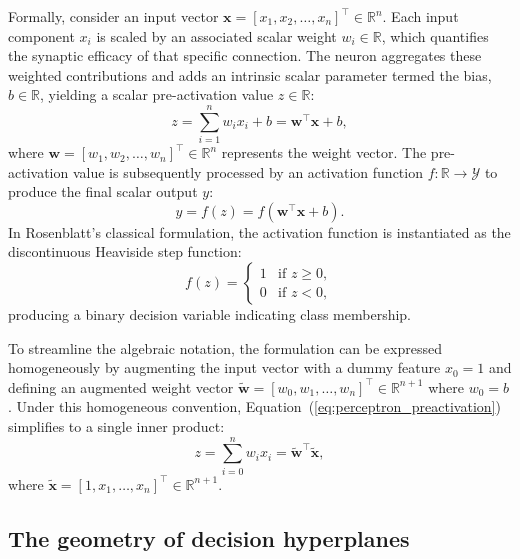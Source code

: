 \documentclass[../../main.tex]{subfiles}
\begin{document}
Formally, consider an input vector $\mathbf{x} = [x_1, x_2, \dots, x_n]^\top \in \mathbb{R}^n$. Each input component $x_i$ is scaled by an associated scalar weight $w_i \in \mathbb{R}$, which quantifies the synaptic efficacy of that specific connection. The neuron aggregates these weighted contributions and adds an intrinsic scalar parameter termed the bias, $b \in \mathbb{R}$, yielding a scalar pre-activation value $z \in \mathbb{R}$:
\begin{equation}
z = \sum_{i=1}^n w_i x_i + b = \mathbf{w}^\top \mathbf{x} + b,
\label{eq:perceptron_preactivation}
\end{equation}
where $\mathbf{w} = [w_1, w_2, \dots, w_n]^\top \in \mathbb{R}^n$ represents the weight vector. The pre-activation value is subsequently processed by an activation function $f: \mathbb{R} \to \mathcal{Y}$ to produce the final scalar output $y$:
\begin{equation}
y = f(z) = f\left(\mathbf{w}^\top \mathbf{x} + b\right).
\label{eq:perceptron_output}
\end{equation}
In Rosenblatt's classical formulation, the activation function is instantiated as the discontinuous Heaviside step function:
\begin{equation}
f(z) = \begin{cases} 
1 & \text{if } z \ge 0, \\ 
0 & \text{if } z < 0,
\end{cases}
\end{equation}
producing a binary decision variable indicating class membership.

To streamline the algebraic notation, the formulation can be expressed homogeneously by augmenting the input vector with a dummy feature $x_0 = 1$ and defining an augmented weight vector $\tilde{\mathbf{w}} = [w_0, w_1, \dots, w_n]^\top \in \mathbb{R}^{n+1}$ where $w_0 = b$. Under this homogeneous convention, Equation~(\ref{eq:perceptron_preactivation}) simplifies to a single inner product:
\begin{equation}
z = \sum_{i=0}^n w_i x_i = \tilde{\mathbf{w}}^\top \tilde{\mathbf{x}},
\end{equation}
where $\tilde{\mathbf{x}} = [1, x_1, \dots, x_n]^\top \in \mathbb{R}^{n+1}$.

\subsection{The geometry of decision hyperplanes}
\label{subsec:hyperplane_geometry}
\end{document}
